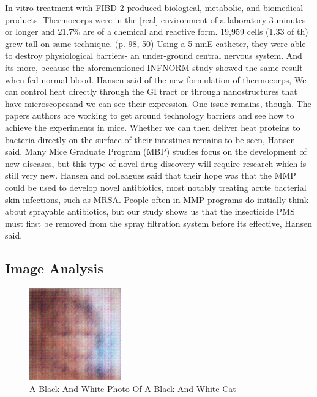 \documentclass{article}%
\begin{document}
 In vitro treatment with FIBD{-}2 produced biological, metabolic, and biomedical products. Thermocorps were in the {[}real{]} environment of a laboratory 3 minutes or longer and 21.7\% are of a chemical and reactive form. 19,959 cells (1.33 of th) grew tall on same technique. (p. 98, 50)\newline%
 Using a 5 nmE catheter, they were able to destroy physiological barriers{-} an under{-}ground central nervous system.\newline%
And its more, because the aforementioned INFNORM study showed the same result when fed normal blood.\newline%
Hansen said of the new formulation of thermocorps, We can control heat directly through the GI tract or through nanostructures that have microscopesand we can see their expression.\newline%
One issue remains, though.\newline%
The papers authors are working to get around technology barriers and see how to achieve the experiments in mice. Whether we can then deliver heat proteins to bacteria directly on the surface of their intestines remains to be seen, Hansen said.\newline%
Many Mice Graduate Program (MBP) studies focus on the development of new diseases, but this type of novel drug discovery will require research which is still very new.\newline%
Hansen and colleagues said that their hope was that the MMP could be used to develop novel antibiotics, most notably treating acute bacterial skin infections, such as MRSA.\newline%
People often in MMP programs do initially think about sprayable antibiotics, but our study shows us that the insecticide PMS must first be removed from the spray filtration system before its effective, Hansen said.

%
\subsection{Image Analysis}%
\label{subsec:ImageAnalysis}%


\begin{figure}[h!]%
\centering%
\includegraphics[width=150px]{500_fake_images/samples_5_495.png}%
\caption{A Black And White Photo Of A Black And White Cat}%
\end{figure}

%
\end{document}

